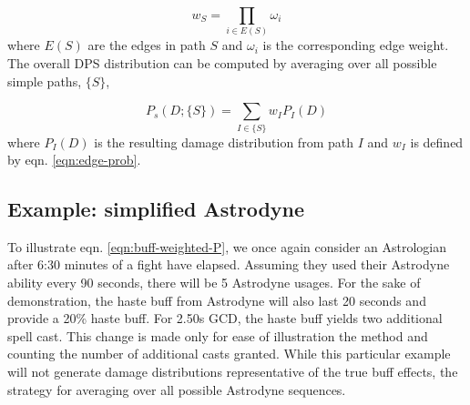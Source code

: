 \documentclass{article}
\begin{document}
    \begin{equation}\label{eqn:edge-prob}
        w_S = \prod_{i \in E(S)} \omega_i
    \end{equation}
    where $E(S)$ are the edges in path $S$ and $\omega_i$ is the corresponding edge weight. The overall DPS distribution can be computed by averaging over all possible simple paths, $\{S\}$,

    \begin{equation}\label{eqn:buff-weighted-P}
        P_s(D; \{S\}) = \sum_{I \in \{S\}} w_I P_I(D)
    \end{equation}
    where $P_I(D)$ is the resulting damage distribution from path $I$ and $w_I$ is defined by eqn. \ref{eqn:edge-prob}.

    \subsection{Example: simplified Astrodyne}
    
    
    To illustrate eqn. \ref{eqn:buff-weighted-P}, we once again consider an Astrologian after 6:30 minutes of a fight have elapsed. Assuming they used their Astrodyne ability every 90 seconds, there will be 5 Astrodyne usages. For the sake of demonstration, the haste buff from Astrodyne will also last 20 seconds and provide a 20\% haste buff. For 2.50s GCD, the haste buff yields two additional spell cast. This change is made only for ease of illustration the method and counting the number of additional casts granted. While this particular example will not generate damage distributions representative of the true buff effects, the strategy for averaging over all possible Astrodyne sequences.
\end{document}
